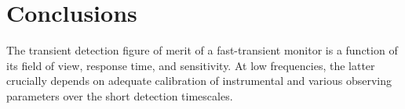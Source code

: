 \documentclass[referee]{aa}
\begin{document}




\section{Conclusions}

The  transient detection  figure  of merit  of  a fast-transient  monitor is  a
function  of  its  field  of  view,  response  time,  and  sensitivity.   At  low
frequencies,   the  latter   crucially  depends   on  adequate   calibration  of
instrumental  and   various  observing  parameters  over   the  short  detection
timescales.  
\end{document}

